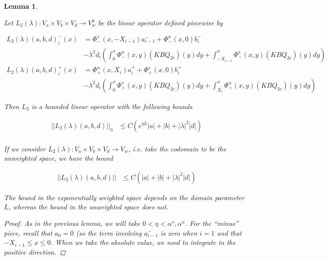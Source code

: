 \documentclass[12pt]{article}
\newtheorem{lemma}{Lemma}
\begin{document}
\begin{lemma}\label{L2}

Let $L_2(\lambda): V_a \times V_b \times V_d \rightarrow V_w^\eta$ be the linear operator defined piecewise by

\begin{align*}
L_2(\lambda)(a, b, d)_i^-(x) &= \Phi^s_-(x, -X_{i-1})a^-_{i-1} + \Phi^u_-(x, 0)b_i^- \\
&- \lambda^2 d_i \left( \int_0^x \Phi^u_-(x, y)(KBQ_{2c})(y) dy  + \int_{-X_{i-1}}^x \Phi^s_-(x, y)(KBQ_{2c})(y) dy \right)\\
L_2(\lambda)(a, b, d)_i^+(x) &= \Phi^u_+(x, X_i)a^+_{i} + \Phi^s_+(x, 0)b_i^+ \\
&- \lambda^2 d_i \left( \int_0^x \Phi^s_+(x, y)(KBQ_{2c})(y) dy + \int_{X_{i}}^x \Phi^u_+(x, y)(KBQ_{2c})(y) dy \right)
\end{align*}

Then $L_2$ is a bounded linear operator with the following bounds

\begin{align*}
||L_2(\lambda)(a, b, d)||_\eta &\leq C(e^{\eta L}|a| + |b| + |\lambda|^2 |d|) \\
\end{align*}

If we consider $L_2(\lambda): V_a \times V_b \times V_d \rightarrow V_w$, i.e. take the codomain to be the unweighted space, we have the bound 

\begin{align*}
||L_2(\lambda)(a, b, d)|| &\leq C(|a| + |b| + |\lambda|^2 |d|)
\end{align*}

The bound in the exponentially weighted space depends on the domain parameter $L$, whereas the bound in the unweighted space does not.

\begin{proof}

As in the previous lemma, we will take $0 < \eta < \alpha^s, \alpha^u$. For the ``minus'' piece, recall that $a_0 = 0$ (so the term involving $a^-_{i-1}$ is zero when $i = 1$ and that $-X_{i-1} \leq x \leq 0$. When we take the absolute value, we need to integrate in the positive direction.


\end{proof}
\end{lemma}
\end{document}
